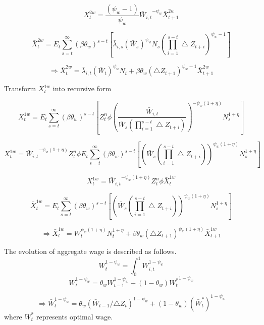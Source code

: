 \documentclass[11pt, a4paper]{article}
\begin{document}
 \begin{equation}  X_{t}^{2w} =\frac{(\psi_w-1)}{\psi_w} {\bar{W}_{i,t}}^{-\psi_w} \bar{X}_{t+1}^{2w} \end{equation}

\[ \bar{X}_{t}^{2w} =  E_t \sum_{s=t}^{\infty} (\beta \theta_w)^{s-t}\left[{{\bar{\lambda}_{i,s}}  \left({\bar{W}_{s}} \right)^{\psi_w} N_s} { \left({\prod_{i=1}^{s-t} \bigtriangleup Z_{t+i}}\right)^{\psi_w-1}} \right ]\]

 \begin{equation} \Rightarrow \bar{X}_{t}^{2w} =  {{\bar{\lambda}_{i,t}}  \left({\bar{W}_{t}} \right)^{\psi_w} N_t} + \beta \theta_w { \left({\bigtriangleup Z_{t+1}}\right)^{\psi_w-1}} \bar{X}_{t+1}^{2w} \end{equation}

Transform $X_t^{1w}$ into recursive form

\[X_{t}^{1w} = E_t \sum_{s=t}^{\infty} (\beta \theta_w)^{s-t}\left[{{Z_t^n}\phi} \left( \frac{\bar{W}_{i,t}}{\bar{W}_s \left({\prod_{i=1}^{s-t} \bigtriangleup Z_{t+i}}\right)} \right)^{-\psi_w (1+\eta)} N_s^{1+\eta}\right]\]

\[X_{t}^{1w} = {\bar{W}_{i,t}}^{-\psi_w (1+\eta)}{{Z_t^n}\phi} E_t \sum_{s=t}^{\infty} (\beta \theta_w)^{s-t}\left[ \left( {\bar{W}_s \left({\prod_{i=1}^{s-t} \bigtriangleup Z_{t+i}}\right)} \right)^{\psi_w (1+\eta)} N_s^{1+\eta}\right] \]

\begin{equation} X_{t}^{1w} = {\bar{W}_{i,t}}^{-\psi_w (1+\eta)}{{Z_t^n}\phi} \bar{X}_{t}^{1w} \end{equation}

\[ \bar{X}_{t}^{1w} = E_t \sum_{s=t}^{\infty} (\beta \theta_w)^{s-t}\left[ \left( {\bar{W}_s \left({\prod_{i=1}^{s-t} \bigtriangleup Z_{t+i}}\right)} \right)^{\psi_w (1+\eta)} N_s^{1+\eta}\right]\]

\begin{equation} \Rightarrow \bar{X}_{t}^{1w} = W_t^{\psi_w(1+\eta)}  N_t^{1+\eta} + \beta \theta_w (\bigtriangleup Z_{t+1})^{\psi_w(1+\eta)} \bar{X}_{t+1}^{1w}\end{equation}

 The evolution of aggregate wage is described as follows.
\[W_t^{1-\psi_w}  =  \int_0^1 W_{i,t}^{1-\psi_w}  \]
\[W_t^{1-\psi_w}  =  \theta_w W_{t-1} ^{1-\psi_w} + (1-\theta_w) {W_{t}^*}^{1-\psi_w}  \]

\[\Rightarrow\bar{W}_t^{1-\psi_w}  =  \theta_w (\bar{W}_{t-1}/{\bigtriangleup Z_t}) ^{1-\psi_w} + (1-\theta_w) ({\bar{W}_{t}^*})^{1-\psi_w}  \]
where $W_t^*$ represents optimal wage. \\
\end{document}
